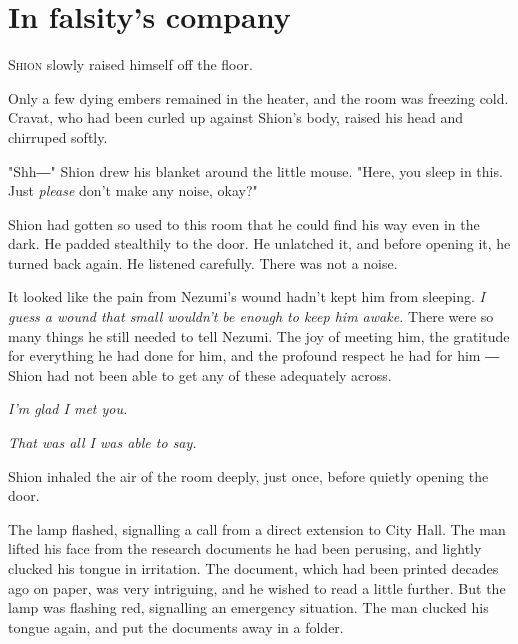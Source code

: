 
\chapter{In falsity's company}


\lettrine{S}{hion} slowly raised himself off the floor.

Only a few dying embers remained in the heater, and the room was
freezing cold. Cravat, who had been curled up against Shion's body,
raised his head and chirruped softly.

"Shh―" Shion drew his blanket around the little mouse. "Here, you sleep
in this. Just \emph{please} don't make any noise, okay?"

Shion had gotten so used to this room that he could find his way even in
the dark. He padded stealthily to the door. He unlatched it, and before
opening it, he turned back again. He listened carefully. There was not a
noise.

It looked like the pain from Nezumi's wound hadn't kept him from
sleeping. \emph{I guess a wound that small wouldn't be enough to keep him
awake.} There were so many things he still needed to tell Nezumi. The joy
of meeting him, the gratitude for everything he had done for him, and
the profound respect he had for him ― Shion had not been able to get any
of these adequately across.

\emph{I'm glad I met you.}

\emph{That was all I was able to say.}

Shion inhaled the air of the room deeply, just once, before quietly
opening the door.

\mybreak

The lamp flashed, signalling a call from a direct extension to City
Hall. The man lifted his face from the research documents he had been
perusing, and lightly clucked his tongue in irritation. The document,
which had been printed decades ago on paper, was very intriguing, and he
wished to read a little further. But the lamp was flashing red,
signalling an emergency situation. The man clucked his tongue again, and
put the documents away in a folder.

